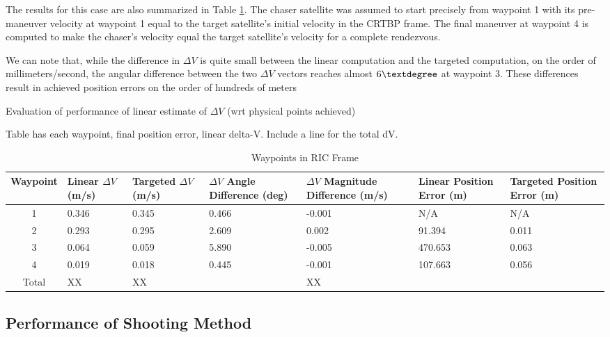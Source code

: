 \documentclass[]{article}
\begin{document}
The results for this case are also summarized in Table \ref{tab:Results_1}.  The chaser satellite was assumed to start precisely from waypoint 1 with its pre-maneuver velocity at waypoint 1 equal to the target satellite's initial velocity in the CRTBP frame.  The final maneuver at waypoint 4 is computed to make the chaser's velocity equal the target satellite's velocity for a complete rendezvous.

We can note that, while the difference in \(\Delta V\) is quite small between the linear computation and the targeted computation, on the order of millimeters/second, the angular difference between the two \(\Delta V\) vectors reaches almost \(6\textdegree\) at waypoint 3.  These differences result in achieved position errors on the order of hundreds of meters

Evaluation of performance of linear estimate of \(\Delta V\) (wrt physical points achieved)

Table has each waypoint, final position error, linear delta-V.  Include a line for the total dV.

\begin{table}[h] \label{tab:Results_1}
	\begin{center}
		\begin{tabular}{c p{1cm} p{1cm} p{1.5cm} p{1.5cm} p{1.5cm} p{1.5cm}}
			\toprule
			Waypoint   & Linear \(\Delta V\) (m/s) & Targeted \(\Delta V\) (m/s) & \(\Delta V\) Angle Difference (deg) & \(\Delta V\) Magnitude Difference (m/s) & Linear Position Error (m) & Targeted Position Error (m) \\
			\midrule
			1 & 0.346 &	0.345 &	0.466 &	-0.001 &	N/A &	N/A \\
			2 & 0.293 &	0.295 &	2.609 &	0.002 &	91.394 &	0.011 \\
			3 & 0.064 &	0.059 &	5.890 &	-0.005 &	470.653 &	0.063 \\
			4 & 0.019 &	0.018 &	0.445 &	-0.001 &	107.663 &	0.056 \\
			Total & XX  & XX &  & XX &  & \\
			\bottomrule
		\end{tabular}
		\caption{Waypoints in RIC Frame}
	\end{center}
\end{table}

\subsection{Performance of Shooting Method}
\end{document}
